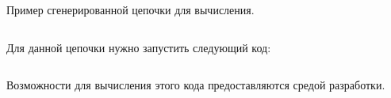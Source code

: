 \begin{frame}
	\frametitle{\insertsection} 
	\framesubtitle{\insertsubsection}
	Пример сгенерированной цепочки для вычисления.
	\inputminted{java}{code/EvalExample.java}
	Для данной цепочки нужно запустить следующий код:
	\inputminted{java}{code/EvalExampleGenerated.java}
	
	Возможности для вычисления этого кода предоставляются средой разработки.
\end{frame}
